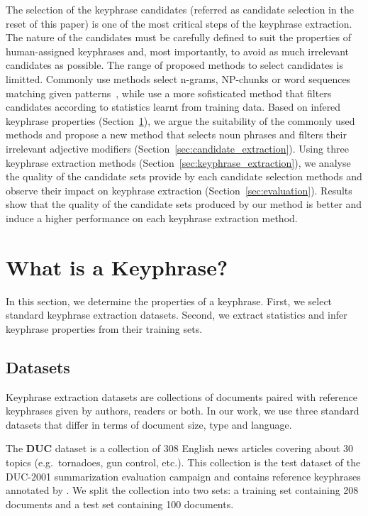   The selection of the keyphrase candidates (referred as candidate selection in
  the reset of this paper) is one of the most critical steps of the keyphrase
  extraction. The nature of the candidates must be carefully defined to suit
  the properties of human-assigned keyphrases and, most importantly, to avoid as
  much irrelevant candidates as possible. The range of proposed methods to
  select candidates is limitted. Commonly use methods select n-grams, NP-chunks
  or word sequences matching given patterns~\cite{hulth2003keywordextraction},
  while  use a more sofisticated method that
  filters candidates according to statistics learnt from training data. Based on
  infered keyphrase properties
  (Section~\ref{sec:definition_of_candidate_keyphrases}), we argue the
  suitability of the commonly used methods and propose a new method that selects
  noun phrases and filters their irrelevant adjective modifiers
  (Section~\ref{sec:candidate_extraction}). Using three keyphrase extraction
  methods (Section~\ref{sec:keyphrase_extraction}), we analyse the quality of
  the candidate sets provide by each candidate selection methods and observe
  their impact on keyphrase extraction (Section~\ref{sec:evaluation}). Results
  show that the quality of the candidate sets produced by our method is better
  and induce a higher performance on each keyphrase extraction method.

\section{What is a Keyphrase?}
\label{sec:definition_of_candidate_keyphrases}
  In this section, we determine the properties of a keyphrase. First, we select
  standard keyphrase extraction datasets. Second, we extract statistics and
  infer keyphrase properties from their training sets.

  \subsection{Datasets}
  \label{subsec:keyphrase_extraction_datasets}
    Keyphrase extraction datasets are collections of documents paired with
    reference keyphrases given by authors, readers or both. In our work, we use
    three standard datasets that differ in terms of document size,  type and
    language.

    The \textbf{DUC} dataset \cite{over2001duc} is a collection of 308 English
    news articles covering about 30 topics (e.g.~tornadoes, gun control, etc.).
    This collection is the test dataset of the DUC-2001 summarization evaluation
    campaign and contains reference keyphrases annotated by
    . We split the collection into two sets: a
    training set containing 208 documents and a test set containing 100
    documents.

